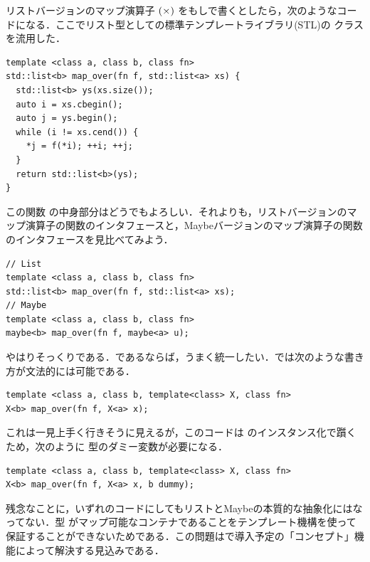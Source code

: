 \documentclass[a5paper,twoside,fleqn,draft]{jsbook}
\begin{document}
リストバージョンのマップ演算子 $(\operatorname{\times})$ をもし\cxx で書くとしたら，次のようなコードになる．ここでリスト型として\cxx の標準テンプレートライブラリ(STL)の  クラスを流用した．
\begin{cxxcode}
\begin{verbatim}
template <class a, class b, class fn>
std::list<b> map_over(fn f, std::list<a> xs) {
  std::list<b> ys(xs.size());
  auto i = xs.cbegin();
  auto j = ys.begin();
  while (i != xs.cend()) {
    *j = f(*i); ++i; ++j;
  }
  return std::list<b>(ys);
}
\end{verbatim}
\end{cxxcode}
この関数  の中身部分はどうでもよろしい．それよりも，リストバージョンのマップ演算子の\cxx 関数のインタフェースと，Maybeバージョンのマップ演算子の\cxx 関数のインタフェースを見比べてみよう．
\begin{cxxcode}
\begin{verbatim}
// List
template <class a, class b, class fn>
std::list<b> map_over(fn f, std::list<a> xs);
// Maybe
template <class a, class b, class fn>
maybe<b> map_over(fn f, maybe<a> u);
\end{verbatim}
\end{cxxcode}
やはりそっくりである．であるならば，うまく統一したい．\cxx では次のような書き方が文法的には可能である．
\begin{cxxcode}
\begin{verbatim}
template <class a, class b, template<class> X, class fn>
X<b> map_over(fn f, X<a> x);
\end{verbatim}
\end{cxxcode}
これは一見上手く行きそうに見えるが，このコードは  のインスタンス化で躓くため，次のように  型のダミー変数が必要になる．
\begin{cxxcode}
\begin{verbatim}
template <class a, class b, template<class> X, class fn>
X<b> map_over(fn f, X<a> x, b dummy);
\end{verbatim}
\end{cxxcode}
残念なことに，いずれのコードにしてもリストとMaybeの本質的な抽象化にはなってない．型  がマップ可能なコンテナであることをテンプレート機構を使って保証することができないためである．この問題は\cxxtwelve で導入予定の「コンセプト」機能によって解決する見込みである．

\end{document}
